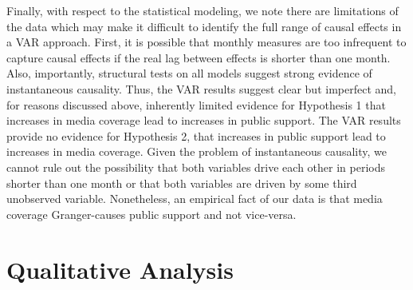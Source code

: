 \documentclass[12pt,]{article}
\begin{document}
Finally, with respect to the statistical modeling, we note there are
limitations of the data which may make it difficult to identify the full
range of causal effects in a VAR approach. First, it is possible that
monthly measures are too infrequent to capture causal effects if the
real lag between effects is shorter than one month. Also, importantly,
structural tests on all models suggest strong evidence of instantaneous
causality. Thus, the VAR results suggest clear but imperfect and, for
reasons discussed above, inherently limited evidence for Hypothesis 1
that increases in media coverage lead to increases in public support.
The VAR results provide no evidence for Hypothesis 2, that increases in
public support lead to increases in media coverage. Given the problem of
instantaneous causality, we cannot rule out the possibility that both
variables drive each other in periods shorter than one month or that
both variables are driven by some third unobserved variable.
Nonetheless, an empirical fact of our data is that media coverage
Granger-causes public support and not vice-versa.

\section{Qualitative Analysis}\label{qualitative-analysis}
\end{document}
